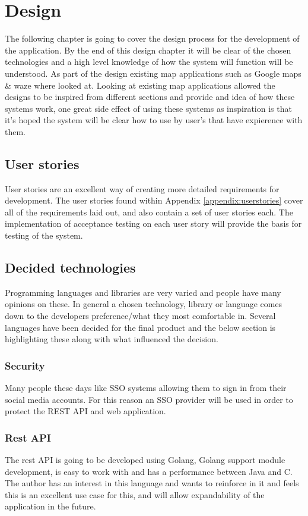 \section{Design}
The following chapter is going to cover the design process for the development of the application. By the end of this design chapter it will be clear of the chosen technologies and a high level knowledge of how the system will function will be understood. As part of the design existing map applications such as Google maps \& waze where looked at. Looking at existing map applications allowed the designs to be inspired from different sections and provide and idea of how these systems work, one great side effect of using these systems as inspiration is that it's hoped the system will be clear how to use by user's that have expierence with them.

\subsection{User stories}
User stories are an excellent way of creating more detailed requirements for development. The user stories found within Appendix \ref{appendix:userstories} cover all of the requirements laid out, and also contain a set of user stories each. The implementation of acceptance testing on each user story will provide the basis for testing of the system.

\subsection{Decided technologies}
Programming languages and libraries are very varied and people have many opinions on these. In general a chosen technology, library or language comes down to the developers preference/what they most comfortable in. Several languages have been decided for the final product and the below section is highlighting these along with what influenced the decision.

\subsubsection{Security}
Many people these days like SSO systems allowing them to sign in from their social media accounts. For this reason an SSO provider will be used in order to protect the REST API and web application.

\subsubsection{Rest API}
The rest API is going to be developed using Golang, Golang support module development, is easy to work with and has a performance between Java and C. The author has an interest in this language and wants to reinforce in it and feels this is an excellent use case for this, and will allow expandability of the application in the future.

